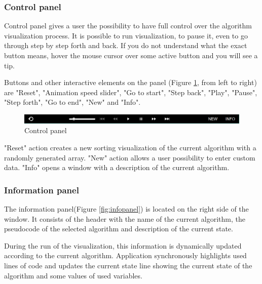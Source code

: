 \documentclass[
  field=inf,
  biblatex,
  language=english,
  glossaries,
  theorems=false,
  sourcecodes=false,
  index
]{kidiplom}
\begin{document}
\subsubsection{Control panel}

Control panel gives a user the possibility to have full control over the algorithm visualization process. It is possible to run visualization, to pause it, even to go through step by step forth and back. If you do not understand what the exact button means, hover the mouse cursor over some active button and you will see a tip.

Buttons and other interactive elements on the panel (Figure \ref{fig:controls}, from left to right) are "Reset", "Animation speed slider", "Go to start", "Step back", "Play", "Pause", "Step forth", "Go to end", "New" and "Info".

\begin{figure}[H]
\begin{center}
	\includegraphics[scale=0.5]{img/ui/Controls.png}
	\caption{Control panel}\label{fig:controls}
\end{center}
\end{figure}

"Reset" action creates a new sorting visualization of the current algorithm with a randomly generated array. "New" action allows a user possibility to enter custom data. "Info" opens a window with a description of the current algorithm.

\subsubsection{Information panel}

The information panel(Figure \ref{fig:infopanel}) is located on the right side of the window. It consists of the header with the name of the current algorithm, the pseudocode of the selected algorithm and description of the current state.

During the run of the visualization, this information is dynamically updated according to the current algorithm. Application synchronously highlights used lines of code and updates the current state line showing the current state of the algorithm and some values of used variables.
\end{document}
